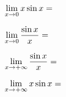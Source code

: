 \documentclass{ximera}
\begin{document}
\begin{example}
\begin{question} \def\isC{correct} $\limx x\sin x = $ \localoefoptions \end{question}
\begin{question} \def\isD{correct} $\limx \frac{\sin x}{x} = $ \localoefoptions \end{question}
\begin{question} \def\isC{correct} $\limxi \frac{\sin x}{x} = $ \localoefoptions \end{question}
\begin{question} \def\isE{correct} $\limxi x\sin x = $ \localoefoptions \end{question}




\end{example}


\begin{comment}

\begin{exercise} \ 
	Bereken op basis van volgende welbekende grafieken onderstaande limieten

\begin{image}[\textwidth]bestaat niet
	\begin{tikzpicture}
		\begin{axis}
		[
		axis equal,
		ymax=5,ymin=-5,
		samples=200,
		axis lines=center,
		extra y ticks={0},
		  restrict y to domain=-10:10,
		]
		\addplot[domain=-5:5,color=blue] {1/x^2};
		\legend{$1/x^2$}
		\end{axis}
	\end{tikzpicture}
\quad
	\begin{tikzpicture}
	\begin{axis}
	[
	axis equal,
	ymax=5,ymin=-5,
	samples=200,
	axis lines=center,
	extra y ticks={0},
    restrict y to domain=-10:10,
	]
	\addplot[domain=-5:5,color=blue] {1/x};
	\legend{$1/x$}
	\end{axis}
	\end{tikzpicture}
\quad
	\begin{tikzpicture}
	\begin{axis}
	[
    axis equal,
    ymax=5,ymin=-5,
	samples=200,
	axis lines=center,
	extra y ticks={0},
    restrict y to domain=-10:10,
	]
	\addplot[domain=-5:5,color=blue] {exp(x)};
	\addplot[domain=0.001:5,color=blue,dashed] {ln(x)};
	\legend{$e^x$, $\ln x$}
	\end{axis}
	\end{tikzpicture}
\end{image}
	

\end{comment}
\end{document}

